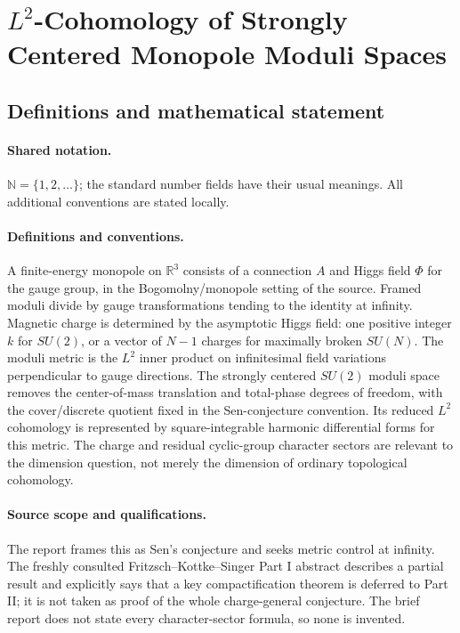 \documentclass[11pt]{article}
\begin{document}
\section{$L^2$-Cohomology of Strongly Centered Monopole Moduli Spaces}\label{statement}

\subsection{Definitions and mathematical statement}

\paragraph{Shared notation.}$\mathbb N=\{1,2,\ldots\}$; the standard number fields have their usual meanings. All additional conventions are stated locally.


\paragraph{Definitions and conventions.} A finite-energy monopole on $\mathbb R^3$ consists of a connection $A$ and Higgs field $\Phi$ for the gauge group, in the Bogomolny/monopole setting of the source. Framed moduli divide by gauge transformations tending to the identity at infinity. Magnetic charge is determined by the asymptotic Higgs field: one positive integer $k$ for $SU(2)$, or a vector of $N-1$ charges for maximally broken $SU(N)$. The moduli metric is the $L^2$ inner product on infinitesimal field variations perpendicular to gauge directions. The strongly centered $SU(2)$ moduli space removes the center-of-mass translation and total-phase degrees of freedom, with the cover/discrete quotient fixed in the Sen-conjecture convention. Its reduced $L^2$ cohomology is represented by square-integrable harmonic differential forms for this metric. The charge and residual cyclic-group character sectors are relevant to the dimension question, not merely the dimension of ordinary topological cohomology.

\paragraph{Source scope and qualifications.} The report frames this as Sen's conjecture and seeks metric control at infinity. The freshly consulted Fritzsch--Kottke--Singer Part I abstract describes a partial result and explicitly says that a key compactification theorem is deferred to Part II; it is not taken as proof of the whole charge-general conjecture. The brief report does not state every character-sector formula, so none is invented.
\end{document}
